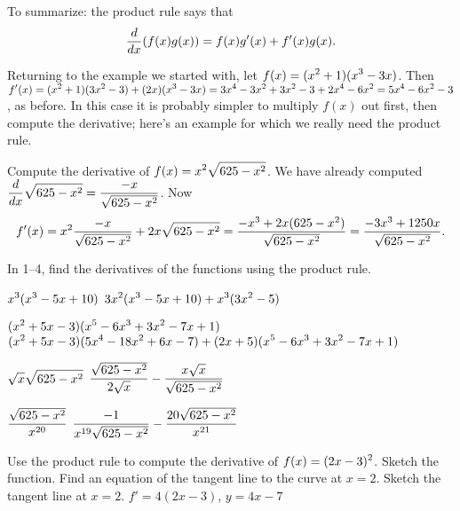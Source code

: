 

To summarize: the product rule says that
$${d\over dx}(f(x)g(x)) = f(x)g'(x) + f'(x)g(x).
$$

Returning to the example we started with, let $\displaystyle f(x)=(x^2+1)(x^3-3x)$.
Then $\displaystyle f'(x)=(x^2+1)(3x^2-3)+(2x)(x^3-3x)=3x^4-3x^2+3x^2-3+2x^4-6x^2=
5x^4-6x^2-3$, as before. In this case it is probably simpler to
multiply $f(x)$ out first, then compute the derivative; here's an
example for which we really need the product rule.

\example Compute the derivative of $\displaystyle f(x)=x^2\sqrt{625-x^2}$.  We have
already computed $\displaystyle {d\over
  dx}\sqrt{625-x^2}={-x\over\sqrt{625-x^2}}$.  Now
$$f'(x)=x^2{-x\over\sqrt{625-x^2}}+2x\sqrt{625-x^2}=
{-x^3+2x(625-x^2)\over \sqrt{625-x^2}}=
{-3x^3+1250x\over \sqrt{625-x^2}}.
$$
\vskip-10pt\endexample

\exercises

In 1--4, find the derivatives of the functions using the product rule.

\exercise $\displaystyle x^3(x^3-5x+10)$
\answer $\displaystyle 3x^2(x^3-5x+10)+x^3(3x^2-5)$
\endanswer
\endexercise

\exercise $\displaystyle (x^2+5x-3)(x^5-6x^3+3x^2-7x+1)$
\answer $\displaystyle (x^2+5x-3)(5x^4-18x^2+6x-7)+(2x+5)(x^5-6x^3+3x^2-7x+1)$
\endanswer
\endexercise

\exercise $\displaystyle \sqrt{x}\sqrt{625-x^2}$
\answer $\displaystyle \displaystyle{\sqrt{625-x^2}\over 2\sqrt{x}}-{x\sqrt{x}\over\sqrt{625-x^2}}$
\endanswer
\endexercise

\exercise $\displaystyle {\sqrt{625-x^2}\over x^{20}}$
\answer $\displaystyle{-1\over x^{19}\sqrt{625-x^2}}-{20\sqrt{625-x^2}\over x^{21}}$
\endanswer
\endexercise

\exercise Use the product rule to compute the derivative of $\displaystyle f(x)=(2x-3)^2$.
 Sketch the function.  Find an equation of the tangent line to the curve at
 $x=2$.  Sketch the tangent line at $x=2$.
\answer $f'=4(2x-3)$, $y=4x-7$
\endanswer
\endexercise

